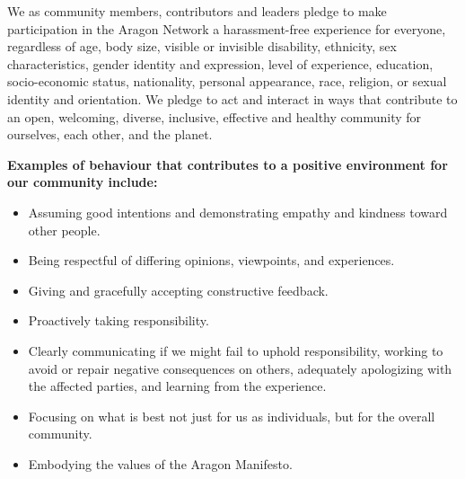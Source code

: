 
\label{chap:CommunityGuidelines}


\label{sec:CodeOfConduct}

We as community members, contributors and leaders pledge to make participation in the Aragon Network a harassment-free experience for everyone, regardless of age, body size, visible or invisible disability, ethnicity, sex characteristics, gender identity and expression, level of experience, education, socio-economic status, nationality, personal appearance, race, religion, or sexual identity and orientation.
We pledge to act and interact in ways that contribute to an open, welcoming, diverse, inclusive, effective and healthy community for ourselves, each other, and the planet.


\label{sec:OurStandards}

\textbf{Examples of behaviour that contributes to a positive environment for our community include:}
\begin{itemize}
	\item Assuming good intentions and demonstrating empathy and kindness toward other people. 
	\item Being respectful of differing opinions, viewpoints, and experiences.
	\item Giving and gracefully accepting constructive feedback.
	\item Proactively taking responsibility.
	\item Clearly communicating if we might fail to uphold responsibility, working to avoid or repair negative consequences on others, adequately apologizing with the affected parties, and learning from the experience.
	\item Focusing on what is best not just for us as individuals, but for the overall community.
	\item Embodying the values of the Aragon Manifesto.
\end{itemize}
	
